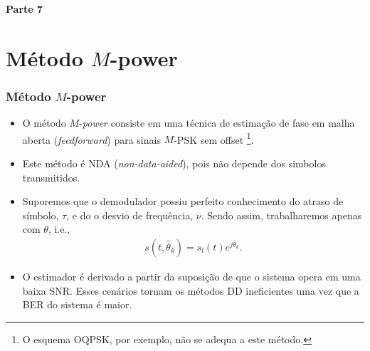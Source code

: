 
\begin{frame}
	\begin{block}{\centering\large\bfseries Parte 7}
		\centering\large\insertpart
	\end{block}
\end{frame}

\section{Método \(M\)-power}
\begin{frame}[t]
	\frametitle{Método \(M\)-power}
	
	\begin{itemize}
        \item O método \(M\)-\textit{power} consiste em uma técnica de estimação de fase em malha aberta (\textit{feedforward}) para sinais \(M\)-PSK sem offset \footnote{O esquema OQPSK, por exemplo, não se adequa a este método.}.
        \item Este método é NDA (\textit{non-data-aided}), pois não depende dos simbolos transmitidos.
        \item Suporemos que o demodulador possiu perfeito conhecimento do atraso de símbolo, \(\tau\), e do o desvio de frequência, \(\nu\). Sendo assim, trabalharemos apenas com \(\theta\), i.e.,
        \begin{align}
            s(t, \hat{\theta}_{k}) = s_l (t) e^{j\hat{\theta}_{k}}.
            \label{eq:s_t}
        \end{align}
        \item O estimador é derivado a partir da suposição de que o sistema opera em uma baixa SNR. Esses cenários tornam os métodos DD ineficientes uma vez que a BER do sistema é maior.
    \end{itemize}
\end{frame}

